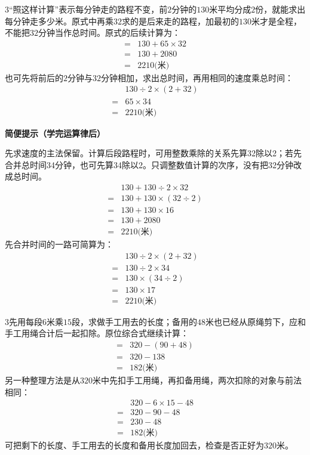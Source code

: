 \documentclass[multi=snippet,border={5bp 20bp 5bp 5bp}]{standalone}
\newenvironment{snippet}[3]{\begin{minipage}{#1bp}\color{answerred}\fontsize{#2}{#3}\selectfont\raggedright}{\end{minipage}}
\begin{document}
\begin{snippet}{505}{11.5}{14}\begin{multicols}{3}\raggedcolumns “照这样计算”表示每分钟走的路程不变，前\(2\)\allowbreak 分钟的\(130\)\allowbreak 米平均分成\(2\)\allowbreak 份，就能求出每分钟走多少米。原式中再乘\(32\)\allowbreak 求的是后来走的路程，加最初的\(130\)\allowbreak 米才是全程，不能把\(32\)\allowbreak 分钟当作总时间。原式的后续计算为：\[\begin{aligned}={}&130+65\times32\\={}&130+2080\\={}&2210\text{(米)}\end{aligned}\]也可先将前后的\(2\)\allowbreak 分钟与\(32\)\allowbreak 分钟相加，求出总时间，再用相同的速度乘总时间：\[\begin{aligned}&130\div2\times(2+32)\\={}&65\times34\\={}&2210\text{(米)}\end{aligned}\]\par\textbf{简便提示（学完运算律后）}\par 先求速度的主法保留。计算后段路程时，可用整数乘除的关系先算32除以2；若先合并总时间34分钟，也可先算34除以2。只调整数值计算的次序，没有把32分钟改成总时间。\[\begin{aligned}&130+130\div2\times32\\={}&130+130\times(32\div2)\\={}&130+130\times16\\={}&130+2080\\={}&2210\text{(米)}\end{aligned}\]先合并时间的一路可简算为：\[\begin{aligned}&130\div2\times(2+32)\\={}&130\div2\times34\\={}&130\times(34\div2)\\={}&130\times17\\={}&2210\text{(米)}\end{aligned}\]\end{multicols}\end{snippet}
\begin{snippet}{505}{11.5}{14}\begin{multicols}{3}\raggedcolumns 先用每段\(6\)\allowbreak 米乘\(15\)\allowbreak 段，求做手工用去的长度；备用的\(48\)\allowbreak 米也已经从原绳剪下，应和手工用绳合计后一起扣除。原位综合式继续计算：\[\begin{aligned}={}&320-(90+48)\\={}&320-138\\={}&182\text{(米)}\end{aligned}\]另一种整理方法是从\(320\)\allowbreak 米中先扣手工用绳，再扣备用绳，两次扣除的对象与前法相同：\[\begin{aligned}&320-6\times15-48\\={}&320-90-48\\={}&230-48\\={}&182\text{(米)}\end{aligned}\]可把剩下的长度、手工用去的长度和备用长度加回去，检查是否正好为\(320\)\allowbreak 米。\end{multicols}\end{snippet}
\end{document}
